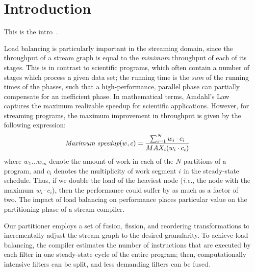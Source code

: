 \section{Introduction}

This is the intro~\cite{streamit-asplos}.

Load balancing is particularly important in the streaming domain,
since the throughput of a stream graph is equal to the {\it minimum}
throughput of each of its stages.  This is in contrast to scientific
programs, which often contain a number of stages which process a given
data set; the running time is the {\it sum} of the running times of
the phases, such that a high-performance, parallel phase can partially
compensate for an inefficient phase.  In mathematical terms, Amdahl's
Law captures the maximum realizable speedup for scientific
applications.  However, for streaming programs, the maximum
improvement in throughput is given by the following expression:
\begin{align*}
\mbox{\it Maximum speedup}(w, c) = \frac{\sum_{i=1}^N{w_i \cdot c_i}}{MAX_i(w_i \cdot c_i)}
\end{align*}
where $w_1 \dots w_m$ denote the amount of work in each of the $N$
partitions of a program, and $c_i$ denotes the multiplicity of work
segment $i$ in the steady-state schedule.  Thus, if we double the load
of the heaviest node ({\it i.e.}, the node with the maximum $w_i \cdot
c_i$), then the performance could suffer by as much as a factor of
two.  The impact of load balancing on performance places particular
value on the partitioning phase of a stream compiler.

Our partitioner employs a set of fusion, fission, and reordering
transformations to incrementally adjust the stream graph to the
desired granularity.  To achieve load balancing, the compiler
estimates the number of instructions that are executed by each filter
in one steady-state cycle of the entire program; then, computationally
intensive filters can be split, and less demanding filters can be
fused.